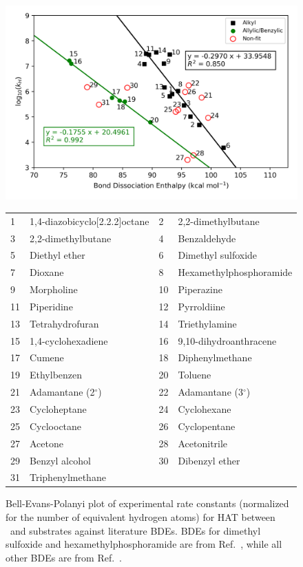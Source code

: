\begin{figure}[!htbp]
  \centering
  \includegraphics[width=\textwidth]{figures/bep-expt}
\begin{tabularx}{\textwidth}{| l X l X |}
  \hline
  1 & 1,4-diazobicyclo[2.2.2]octane & 2 & 2,2-dimethylbutane \\
  3 & 2,2-dimethylbutane & 4 & Benzaldehyde \\
  5 & Diethyl ether & 6 & Dimethyl sulfoxide \\
  7 & Dioxane & 8 & Hexamethylphosphoramide \\
  9 & Morpholine & 10 & Piperazine \\
  11 & Piperidine & 12 & Pyrroldiine \\
  13 & Tetrahydrofuran & 14 & Triethylamine \\
  15 & 1,4-cyclohexadiene & 16 & 9,10-dihydroanthracene \\
  17 & Cumene & 18 & Diphenylmethane \\
  19 & Ethylbenzen & 20 & Toluene \\
  21 & Adamantane (2$^\circ$) & 22 & Adamantane (3$^\circ$) \\
  23 & Cycloheptane & 24 & Cyclohexane \\
  25 & Cyclooctane & 26 & Cyclopentane  \\
  27 & Acetone & 28 & Acetonitrile \\
  29 & Benzyl alcohol & 30 & Dibenzyl ether \\
  31 & Triphenylmethane & & \\
  \hline
\end{tabularx}
  \caption[Bell-Evans-Polanyi plot of experimental rate constants against literature BDEs.]{Bell-Evans-Polanyi plot of experimental rate constants (normalized for the number of equivalent hydrogen atoms) for HAT between \cumo\ and substrates against literature BDEs. BDEs for dimethyl sulfoxide and hexamethylphosphoramide are from Ref.~\protect{}, while all other BDEs are from Ref.~\protect{}.}
\label{fig:bep-expt}
\end{figure}

